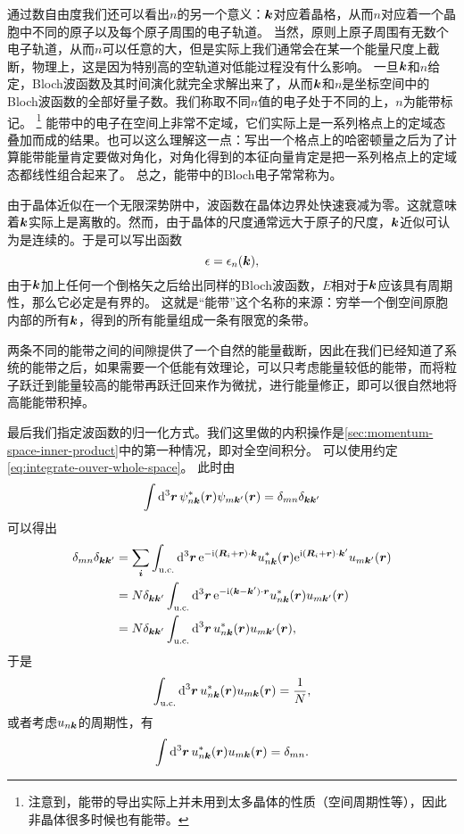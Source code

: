 通过数自由度我们还可以看出$n$的另一个意义：$\vb*{k}$对应着晶格，从而$n$对应着一个晶胞中不同的原子以及每个原子周围的电子轨道。
当然，原则上原子周围有无数个电子轨道，从而$n$可以任意的大，但是实际上我们通常会在某一个能量尺度上截断，物理上，这是因为特别高的空轨道对低能过程没有什么影响。
一旦$\vb*{k}$和$n$给定，Bloch波函数及其时间演化就完全求解出来了，从而$\vb*{k}$和$n$是坐标空间中的Bloch波函数的全部好量子数。我们称取不同$n$值的电子处于不同的上，$n$为能带标记。%
\footnote{注意到，能带的导出实际上并未用到太多晶体的性质（空间周期性等），因此非晶体很多时候也有能带。}%
能带中的电子在空间上非常不定域，它们实际上是一系列格点上的定域态叠加而成的结果。也可以这么理解这一点：写出一个格点上的哈密顿量之后为了计算能带能量肯定要做对角化，对角化得到的本征向量肯定是把一系列格点上的定域态都线性组合起来了。
总之，能带中的Bloch电子常常称为。

由于晶体近似在一个无限深势阱中，波函数在晶体边界处快速衰减为零。这就意味着$\vb*{k}$实际上是离散的。然而，由于晶体的尺度通常远大于原子的尺度，$\vb*{k}$近似可认为是连续的。于是可以写出函数
\[
    \epsilon = \epsilon_n(\vb*{k}),
\]
由于$\vb*{k}$加上任何一个倒格矢之后给出同样的Bloch波函数，$E$相对于$\vb*{k}$应该具有周期性，那么它必定是有界的。
这就是“能带”这个名称的来源：穷举一个倒空间原胞内部的所有$\vb*{k}$，得到的所有能量组成一条有限宽的条带。

两条不同的能带之间的间隙提供了一个自然的能量截断，因此在我们已经知道了系统的能带之后，如果需要一个低能有效理论，可以只考虑能量较低的能带，而将粒子跃迁到能量较高的能带再跃迁回来作为微扰，进行能量修正，即可以很自然地将高能能带积掉。

最后我们指定波函数的归一化方式。我们这里做的内积操作是\autoref{sec:momentum-space-inner-product}中的第一种情况，即对全空间积分。
可以使用约定\eqref{eq:integrate-ouver-whole-space}。
此时由
\begin{equation}
    \int \dd[3]{\vb*{r}} \psi_{n \vb*{k}}^*(\vb*{r}) \psi_{m \vb*{k}'}(\vb*{r}) = \delta_{mn} \delta_{\vb*{k} \vb*{k}'}
\end{equation}
可以得出
\[
    \begin{aligned}
        \delta_{mn} \delta_{\vb*{k} \vb*{k}'} &= \sum_{\vb*{i}} \int_\text{u.c.} \dd[3]{\vb*{r}} \mathrm{e}^{- \mathrm{i} (\vb*{R}_i + \vb*{r}) \cdot \vb*{k}} u_{n \vb*{k}}^*(\vb*{r}) \mathrm{e}^{\mathrm{i} (\vb*{R}_i + \vb*{r}) \cdot \vb*{k}'} u_{m \vb*{k}'}(\vb*{r}) \\
        &= N \delta_{\vb*{k} \vb*{k}'} \int_\text{u.c.} \dd[3]{\vb*{r}} \mathrm{e}^{- \mathrm{i} (\vb*{k} - \vb*{k}') \cdot \vb*{r}} u_{n \vb*{k}}^*(\vb*{r}) u_{m \vb*{k}'}(\vb*{r}) \\
        &= N \delta_{\vb*{k} \vb*{k}'} \int_\text{u.c.} \dd[3]{\vb*{r}} u_{n \vb*{k}}^*(\vb*{r}) u_{m \vb*{k}'}(\vb*{r}),
    \end{aligned}
\]
于是
\[
    \int_\text{u.c.} \dd[3]{\vb*{r}} u^*_{n \vb*{k}}(\vb*{r}) u_{m \vb*{k}}(\vb*{r}) = \frac{1}{N},
\]
或者考虑$u_{n \vb*{k}}$的周期性，有
\begin{equation}
    \int \dd[3]{\vb*{r}} u^*_{n \vb*{k}}(\vb*{r}) u_{m \vb*{k}}(\vb*{r}) = \delta_{mn}. 
\end{equation}

